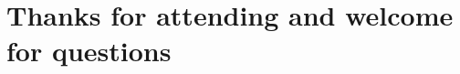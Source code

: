 \documentclass[
size=14pt,
paper=smartboard,  %
mode=present, 		%
display=slides, 	%
pauseslide,
fleqn,leqno]{powerdot}
\begin{document}
%

\section{Thanks for attending and welcome for questions}


\end{document}
